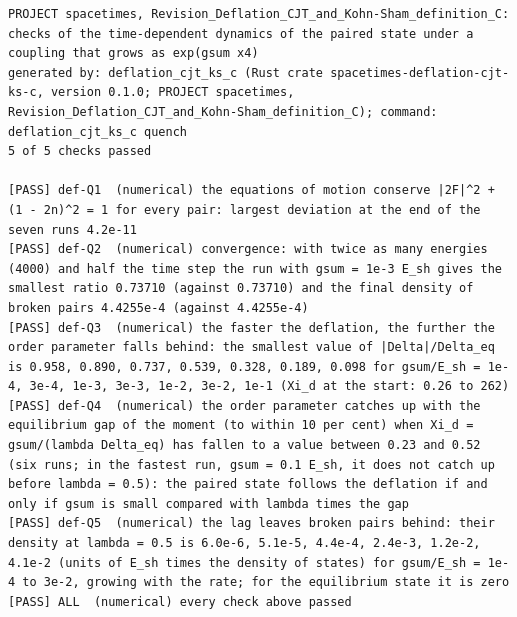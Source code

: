 \documentclass[
  10pt,
]{article}
\begin{document}
\begin{verbatim}
PROJECT spacetimes, Revision_Deflation_CJT_and_Kohn-Sham_definition_C: checks of the time-dependent dynamics of the paired state under a coupling that grows as exp(gsum x4)
generated by: deflation_cjt_ks_c (Rust crate spacetimes-deflation-cjt-ks-c, version 0.1.0; PROJECT spacetimes, Revision_Deflation_CJT_and_Kohn-Sham_definition_C); command: deflation_cjt_ks_c quench
5 of 5 checks passed

[PASS] def-Q1  (numerical) the equations of motion conserve |2F|^2 + (1 - 2n)^2 = 1 for every pair: largest deviation at the end of the seven runs 4.2e-11
[PASS] def-Q2  (numerical) convergence: with twice as many energies (4000) and half the time step the run with gsum = 1e-3 E_sh gives the smallest ratio 0.73710 (against 0.73710) and the final density of broken pairs 4.4255e-4 (against 4.4255e-4)
[PASS] def-Q3  (numerical) the faster the deflation, the further the order parameter falls behind: the smallest value of |Delta|/Delta_eq is 0.958, 0.890, 0.737, 0.539, 0.328, 0.189, 0.098 for gsum/E_sh = 1e-4, 3e-4, 1e-3, 3e-3, 1e-2, 3e-2, 1e-1 (Xi_d at the start: 0.26 to 262)
[PASS] def-Q4  (numerical) the order parameter catches up with the equilibrium gap of the moment (to within 10 per cent) when Xi_d = gsum/(lambda Delta_eq) has fallen to a value between 0.23 and 0.52 (six runs; in the fastest run, gsum = 0.1 E_sh, it does not catch up before lambda = 0.5): the paired state follows the deflation if and only if gsum is small compared with lambda times the gap
[PASS] def-Q5  (numerical) the lag leaves broken pairs behind: their density at lambda = 0.5 is 6.0e-6, 5.1e-5, 4.4e-4, 2.4e-3, 1.2e-2, 4.1e-2 (units of E_sh times the density of states) for gsum/E_sh = 1e-4 to 3e-2, growing with the rate; for the equilibrium state it is zero
[PASS] ALL  (numerical) every check above passed
\end{verbatim}
\end{document}
